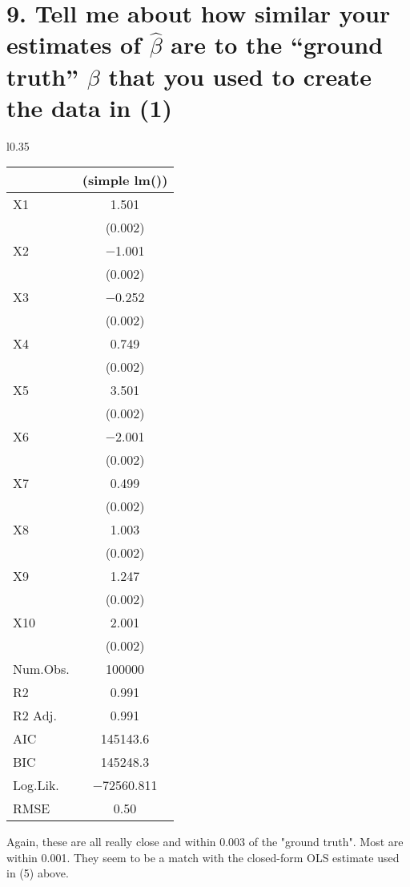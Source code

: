 \documentclass{article}
\begin{document}
\clearpage
\section*{9. Tell me about how similar your estimates of $\hat{\beta}$ are to the “ground truth” ${\beta}$ that you used
 to create the data in (1)}
\begin{wraptable}{l}{0.35\textwidth}
\centering
\begin{tabular}[t]{lc}
\toprule
  & (simple lm())\\
\midrule
X1 & \num{1.501}\\
 & \vphantom{9} (\num{0.002})\\
X2 & \num{-1.001}\\
 & \vphantom{8} (\num{0.002})\\
X3 & \num{-0.252}\\
 & \vphantom{7} (\num{0.002})\\
X4 & \num{0.749}\\
 & \vphantom{6} (\num{0.002})\\
X5 & \num{3.501}\\
 & \vphantom{5} (\num{0.002})\\
X6 & \num{-2.001}\\
 & \vphantom{4} (\num{0.002})\\
X7 & \num{0.499}\\
 & \vphantom{3} (\num{0.002})\\
X8 & \num{1.003}\\
 & \vphantom{2} (\num{0.002})\\
X9 & \num{1.247}\\
 & \vphantom{1} (\num{0.002})\\
X10 & \num{2.001}\\
 & (\num{0.002})\\
\midrule
Num.Obs. & \num{100000}\\
R2 & \num{0.991}\\
R2 Adj. & \num{0.991}\\
AIC & \num{145143.6}\\
BIC & \num{145248.3}\\
Log.Lik. & \num{-72560.811}\\
RMSE & \num{0.50}\\
\bottomrule
\end{tabular}
\end{wraptable}
Again, these are all really close and within 0.003 of the "ground truth". Most are within 0.001. They seem to be a match with the closed-form OLS estimate used in (5) above.
\end{document}
